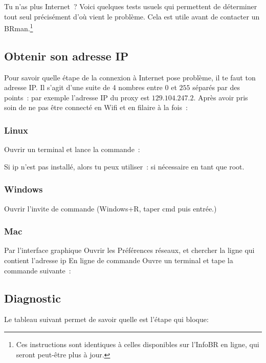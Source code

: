 \label{diagnostic}
Tu n'as plus Internet~? Voici quelques tests usuels qui permettent de déterminer tout seul précisément d'où vient le problème. Cela est utile avant de contacter un BRman.\footnote{Ces instructions sont identiques à celles disponibles sur l'InfoBR en ligne, qui seront peut-être plus à jour.}

\subsection{Obtenir son adresse IP}
Pour savoir quelle étape de la connexion à Internet pose problème, il te faut ton adresse IP. Il s'agit d'une suite de 4 nombres entre $0$ et $255$ séparés par des points~: par exemple l'adresse IP du proxy est $129.104.247.2$. Après avoir pris soin de ne pas être connecté en Wifi et en filaire à la fois~:

\subsubsection{Linux}
Ouvrir un terminal et lance la commande~:

Si ip n'est pas installé, alors tu peux utiliser~:
si nécessaire en tant que root.

\subsubsection{Windows}
Ouvrir l'invite de commande (Windows+R, taper cmd puis entrée.)

\subsubsection{Mac}
Par l'interface graphique
Ouvrir les Préférences réseaux, et chercher la ligne qui contient l'adresse ip
En ligne de commande
Ouvre un terminal et tape la commande suivante~:

\subsection{Diagnostic}
Le tableau suivant permet de savoir quelle est l'étape qui bloque:

